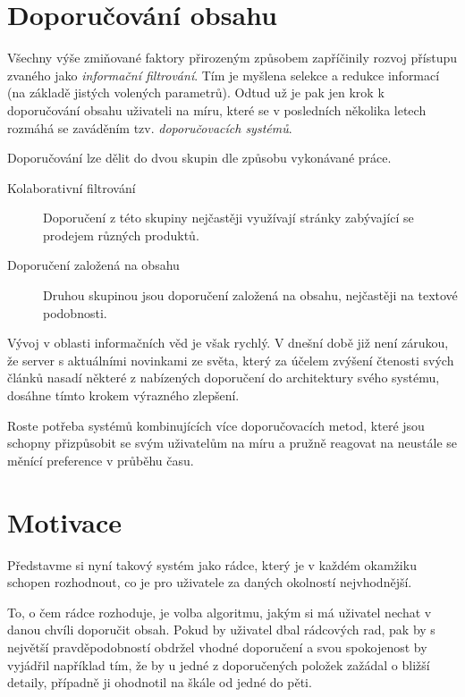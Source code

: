 \documentclass[thesis=M,czech]{FITthesis}[2014/05/07]
\begin{document}
\begin{introduction}
\section{Doporučování obsahu}
\label{sub:recsys}
	Všechny výše zmiňované faktory přirozeným způsobem zapříčinily rozvoj přístupu zvaného jako \emph{informační filtrování}. Tím je myšlena selekce a redukce informací (na základě jistých volených parametrů). Odtud už je pak jen krok k doporučování obsahu uživateli na míru, které se v posledních několika letech rozmáhá se zaváděním tzv. \emph{doporučovacích systémů}.

Doporučování lze dělit do dvou skupin dle způsobu vykonávané práce. 

\begin{description}
	\item[Kolaborativní filtrování] Doporučení z této skupiny nejčastěji využívají stránky zabývající se prodejem různých produktů.
	
	\item[Doporučení založená na obsahu] Druhou skupinou jsou doporučení založená na obsahu, nejčastěji na textové podobnosti.
\end{description}

	Vývoj v oblasti informačních věd je však rychlý. V dnešní době již není zárukou, že server s aktuálními novinkami ze světa, který za účelem zvýšení čtenosti svých článků nasadí některé z nabízených doporučení do architektury svého systému, dosáhne tímto krokem výrazného zlepšení.
	
	Roste potřeba systémů kombinujících více doporučovacích metod, které jsou schopny přizpůsobit se svým uživatelům na míru a pružně reagovat na neustále se měnící preference v průběhu času. 

\section{Motivace} 	
\label{sec:motivation}

	Představme si nyní takový systém jako rádce, který je v každém okamžiku schopen rozhodnout, co je pro uživatele za daných okolností nejvhodnější.
	
	To, o čem rádce rozhoduje, je volba algoritmu, jakým si má uživatel nechat v danou chvíli doporučit obsah. Pokud by uživatel dbal rádcových rad, pak by s největší pravděpodobností obdržel vhodné doporučení a svou spokojenost by vyjádřil například tím, že by u jedné z doporučených položek zažádal o bližší detaily, případně ji ohodnotil na škále od jedné do pěti.
	

\end{introduction}
\end{document}
